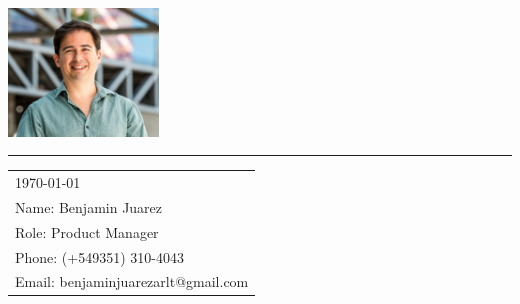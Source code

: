 
\includegraphics[width=0.3\textwidth]{pic.png} %

\vspace{-1em} %

\rule{\linewidth}{1pt} %

\bigskip\bigskip %


\hfill
\begin{tabular}{l @{}}
	\today \midskip\\ %
	Name: Benjamin Juarez \\
	Role: Product Manager \\
	Phone: (+549351) 310-4043 \\
	Email: benjaminjuarezarlt@gmail.com
\end{tabular}

\midskip 

